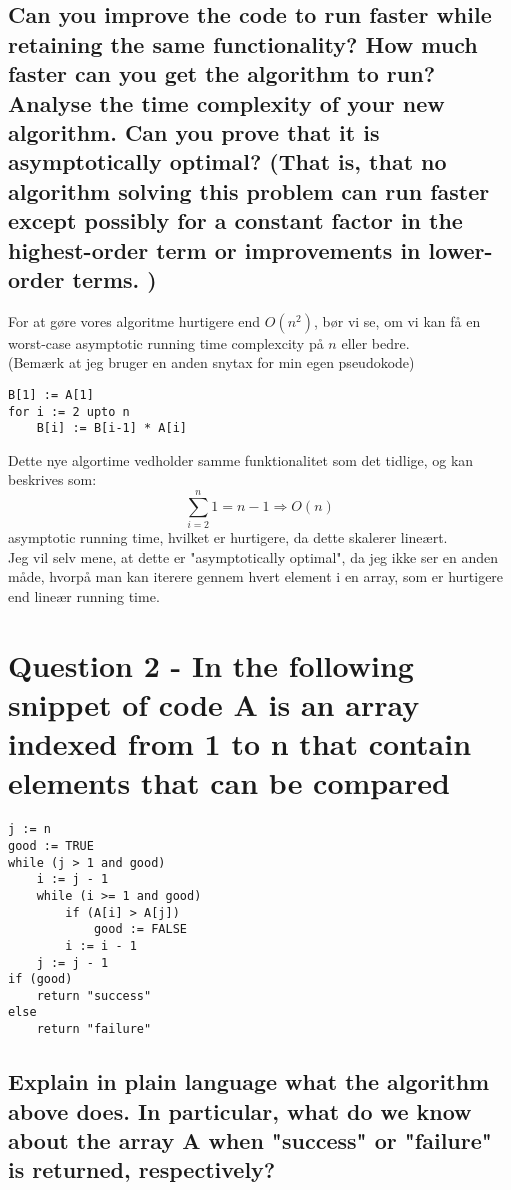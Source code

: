 \documentclass[a4paper,12pt]{article}
\begin{document}
\subsection[]{Can you improve the code to run faster while retaining the same functionality? How
much faster can you get the algorithm to run? Analyse the time complexity of your new
algorithm. Can you prove that it is asymptotically optimal? (That is, that no algorithm
solving this problem can run faster except possibly for a constant factor in the highest-order
term or improvements in lower-order terms. )}

For at gøre vores algoritme hurtigere end $O(n^2)$, bør vi se, om vi kan få en worst-case asymptotic running time complexcity på $n$ eller bedre.\\
(Bemærk at jeg bruger en anden snytax for min egen pseudokode)
\begin{lstlisting}
B[1] := A[1]     
for i := 2 upto n     
    B[i] := B[i-1] * A[i]
\end{lstlisting} 
Dette nye algortime vedholder samme funktionalitet som det tidlige, og kan beskrives som:
\[\sum_{i=2}^{n}1 = n-1 \Rightarrow O(n)\]
asymptotic running time, hvilket er hurtigere, da dette skalerer lineært.\\
Jeg vil selv mene, at dette er "asymptotically optimal", da jeg ikke ser en anden måde, hvorpå man kan iterere gennem hvert element i en array, som er hurtigere end lineær running time.

\section[Question 2]{Question 2 - In the following snippet of code A is an array indexed from 1 to n that contain elements
that can be compared}

\begin{lstlisting}
j := n
good := TRUE
while (j > 1 and good)
    i := j - 1
    while (i >= 1 and good)
        if (A[i] > A[j])
            good := FALSE
        i := i - 1
    j := j - 1
if (good)
    return "success"
else
    return "failure"
\end{lstlisting}
    
\subsection[]{Explain in plain language what the algorithm above does. In particular, what do we know
about the array A when "success" or "failure" is returned, respectively?}
\end{document}
